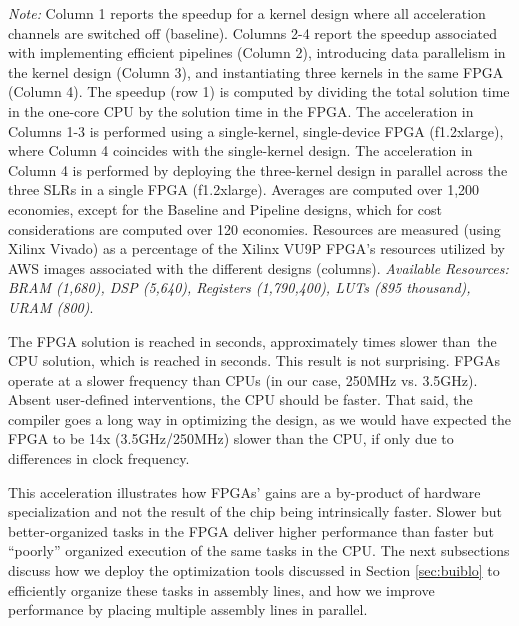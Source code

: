 \documentclass[12pt,american]{article}
\makeatletter
\newcommand{\resultsfolder}{./results}
\newcommand{\awsinstfI}{f1.2xlarge\@\xspace}
\newcommand{\avgfpgaIbasenKMIkItime}{}
\newcommand{\avgcpubasenKMIkItime}{}
\newcommand{\avgfpgacpusbasespeedup}{times slower than}
\newcommand{\CLdesignLUT}{895 thousand}
\newcommand{\CLdesignDSP}{5,640}
\newcommand{\CLdesignRegisters}{1,790,400}
\newcommand{\CLdesignBRAM}{1,680}
\newcommand{\CLdesignURAM}{800}
\makeatother
\begin{document}
\begin{table}[ht!]
\begin{center}
\begin{tabular}{l@{\hskip \xx}c@{\hskip \xx}c@{\hskip \xx} c@{\hskip \xx}c@{\hskip \xx}c@{\hskip \xx} c@{\hskip \xx}}
\bottomrule
\end{tabular}
\end{center}
\small \textit{Note:} Column 1 reports the speedup for a kernel design where all acceleration channels are switched off (baseline). Columns 2-4 report the speedup associated with implementing efficient pipelines (Column 2), introducing data parallelism in the kernel design (Column 3), and instantiating three kernels in the same FPGA (Column 4). The speedup (row 1) is computed by dividing the total solution time in the one-core CPU by the solution time in the FPGA. The acceleration in Columns 1-3 is performed using a single-kernel, single-device FPGA (\awsinstfI), where Column 4 coincides with the single-kernel design. The acceleration in Column 4 is performed by deploying the three-kernel design in parallel across the three SLRs in a single FPGA (\awsinstfI). Averages are computed over 1,200 economies, except for the Baseline and Pipeline designs, which for cost considerations are computed over 120 economies. Resources are measured (using Xilinx Vivado) as a percentage of the Xilinx VU9P FPGA's resources utilized by AWS images associated with the different designs (columns). \textit{Available Resources: BRAM (\CLdesignBRAM), DSP (\CLdesignDSP), Registers (\CLdesignRegisters), LUTs (\CLdesignLUT), URAM (\CLdesignURAM)}. 
\label{tab:acccha}
\end{table}

The FPGA solution is reached in \avgfpgaIbasenKMIkItime seconds, approximately \avgfpgacpusbasespeedup\ the CPU solution, which is reached in \avgcpubasenKMIkItime seconds. This result is not surprising. FPGAs operate at a slower frequency than CPUs (in our case, 250MHz vs. 3.5GHz). Absent user-defined interventions, the CPU should be faster. That said, the compiler goes a long way in optimizing the design, as we would have expected the FPGA to be 14x (3.5GHz/250MHz) slower than the CPU, if only due to differences in clock frequency.

This acceleration illustrates how FPGAs' gains are a by-product of hardware specialization and not the result of the chip being intrinsically faster. Slower but better-organized tasks in the FPGA deliver higher performance than faster but ``poorly'' organized execution of the same tasks in the CPU. The next subsections discuss how we deploy the optimization tools discussed in Section \ref{sec:buiblo} to efficiently organize these tasks in assembly lines, and how we improve performance by placing multiple assembly lines in parallel.
\end{document}
